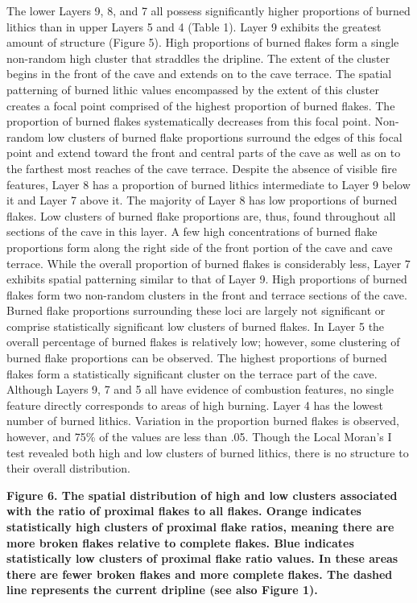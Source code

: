 \documentclass[smallextended]{svjour3}       %
\begin{document}
The lower Layers 9, 8, and 7 all possess significantly higher
proportions of burned lithics than in upper Layers 5 and 4 (Table 1).
Layer 9 exhibits the greatest amount of structure (Figure 5). High
proportions of burned flakes form a single non-random high cluster that
straddles the dripline. The extent of the cluster begins in the front of
the cave and extends on to the cave terrace. The spatial patterning of
burned lithic values encompassed by the extent of this cluster creates a
focal point comprised of the highest proportion of burned flakes. The
proportion of burned flakes systematically decreases from this focal
point. Non-random low clusters of burned flake proportions surround the
edges of this focal point and extend toward the front and central parts
of the cave as well as on to the farthest most reaches of the cave
terrace. Despite the absence of visible fire features, Layer 8 has a
proportion of burned lithics intermediate to Layer 9 below it and Layer
7 above it. The majority of Layer 8 has low proportions of burned
flakes. Low clusters of burned flake proportions are, thus, found
throughout all sections of the cave in this layer. A few high
concentrations of burned flake proportions form along the right side of
the front portion of the cave and cave terrace. While the overall
proportion of burned flakes is considerably less, Layer 7 exhibits
spatial patterning similar to that of Layer 9. High proportions of
burned flakes form two non-random clusters in the front and terrace
sections of the cave. Burned flake proportions surrounding these loci
are largely not significant or comprise statistically significant low
clusters of burned flakes. In Layer 5 the overall percentage of burned
flakes is relatively low; however, some clustering of burned flake
proportions can be observed. The highest proportions of burned flakes
form a statistically significant cluster on the terrace part of the
cave. Although Layers 9, 7 and 5 all have evidence of combustion
features, no single feature directly corresponds to areas of high
burning. Layer 4 has the lowest number of burned lithics. Variation in
the proportion burned flakes is observed, however, and 75\% of the
values are less than .05. Though the Local Moran's I test revealed both
high and low clusters of burned lithics, there is no structure to their
overall distribution.

\textbf{Figure 6. The spatial distribution of high and low clusters
associated with the ratio of proximal flakes to all flakes. Orange
indicates statistically high clusters of proximal flake ratios, meaning
there are more broken flakes relative to complete flakes. Blue indicates
statistically low clusters of proximal flake ratio values. In these
areas there are fewer broken flakes and more complete flakes. The dashed
line represents the current dripline (see also Figure 1).}
\end{document}
